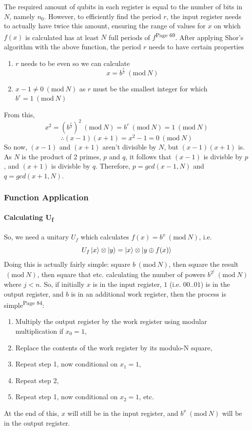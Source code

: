 \documentclass[a4paper,10pt, titlepage, twoside]{article}
\newcommand{\Mod}[1]{\ (\mathrm{mod}\ #1)}
\begin{document}
The required amount of qubits in each register is equal to the number of bits in $N$, namely $n_0$. However, to efficiently find the period $r$, the input register needs to actually have twice this amount, ensuring the range of values for $x$ on which $f(x)$ is calculated has at least $N$ full periods of $f$\cite{qscbook}\textsuperscript{Page 69}. After applying Shor's algorithm with the above function, the period $r$ needs to have certain properties
\begin{enumerate}
    \item $r$ needs to be even so we can calculate
    $$x = b^{\frac{r}{2}}\Mod N$$
    \item $x-1 \neq 0 \Mod N$ as $r$ must be the smallest integer for which $b^r = 1 \Mod N$
\end{enumerate}
From this,
$$ x^2 = (b^{\frac{r}{2}})^2 \Mod N = b^r \Mod N = 1 \Mod N$$
$$\therefore (x-1)(x+1) = x^2 - 1 = 0 \Mod N$$
So now, $(x-1)$ and $(x+1)$ aren't divisible by $N$, but $(x-1)(x+1)$ is. As $N$ is the product of 2 primes, $p$ and $q$, it follows that $(x-1)$ is divisble by $p$, and $(x+1)$ is divisble by $q$. Therefore, $p = gcd(x-1, N)$ and $q = gcd(x+1, N)$.

\subsubsection{Function Application}
\paragraph{Calculating U\textsubscript{f}} So, we need a unitary $U_f$ which calculates $f(x) = b^x \Mod N$, i.e.
$$U_f \ket{x} \otimes \ket{y} = \ket x \otimes \ket{y \oplus f(x)}$$
Doing this is actually fairly simple: square $b \Mod N$, then square the result $\Mod N$, then square that etc. calculating the number of powers $b^{2^j} \Mod N$ where $j < n$. So, if initially $x$ is in the input register, $1$ (i.e. $00..01$) is in the output register, and $b$ is in an additional work register, then the process is simple\cite{qscbook}\textsuperscript{Page 84}:
\begin{enumerate}
    \item Multiply the output register by the work register using modular multiplication if $x_0 = 1$,
    \item Replace the contents of the work register by its modulo-N square,
    \item Repeat step 1, now conditional on $x_1 = 1$,
    \item Repeat step 2,
    \item Repeat step 1, now conditional on $x_2 = 1$, etc.
\end{enumerate}
At the end of this, $x$ will still be in the input register, and $b^x \Mod N$ will be in the output register.
\end{document}
